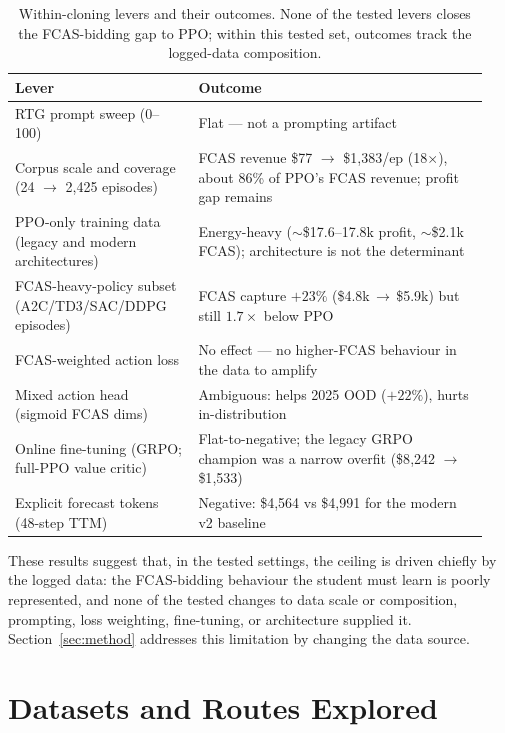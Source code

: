 \documentclass{article}
\begin{document}
\begin{table}[H]
  \centering
  \caption{Within-cloning levers and their outcomes. None of the tested levers
  closes the FCAS-bidding gap to PPO; within this tested set, outcomes track the
  logged-data composition.}
  \label{tab:cloning}
  \small
  \begin{tabular}{>{\raggedright\arraybackslash}p{0.36\linewidth}>{\raggedright\arraybackslash}p{0.58\linewidth}}
    \toprule
    Lever & Outcome \\
    \midrule
    RTG prompt sweep (0--100) & Flat --- not a prompting artifact \\
    Corpus scale and coverage (24 $\to$ 2{,}425 episodes) & FCAS revenue \$77 $\to$
    \$1{,}383/ep (18$\times$), about 86\% of PPO's FCAS revenue; profit gap
    remains \\
    PPO-only training data (legacy and modern architectures) & Energy-heavy
    ($\sim$\$17.6--17.8k profit, $\sim$\$2.1k FCAS); architecture is not the
    determinant \\
    FCAS-heavy-policy subset (A2C/TD3/SAC/DDPG episodes) & FCAS capture
    $+23\%$ (\$4.8k$\,\to\,$\$5.9k) but still $1.7\times$ below PPO \\
    FCAS-weighted action loss & No effect --- no higher-FCAS behaviour in the
    data to amplify \\
    Mixed action head (sigmoid FCAS dims) & Ambiguous: helps 2025 OOD
    ($+22\%$), hurts in-distribution \\
    Online fine-tuning (GRPO; full-PPO value critic) & Flat-to-negative; the
    legacy GRPO champion was a narrow overfit (\$8{,}242 $\to$ \$1{,}533) \\
    Explicit forecast tokens (48-step TTM) & Negative: \$4{,}564 vs \$4{,}991
    for the modern v2 baseline \\
    \bottomrule
  \end{tabular}
\end{table}

These results suggest that, in the tested settings, the ceiling is driven chiefly
by the logged data: the FCAS-bidding behaviour the student must learn is poorly
represented, and none of the tested changes to data scale or composition,
prompting, loss weighting, fine-tuning, or architecture supplied it.
Section~\ref{sec:method} addresses this limitation by changing the data source.

\section{Datasets and Routes Explored}
\label{app:routes}
\end{document}
